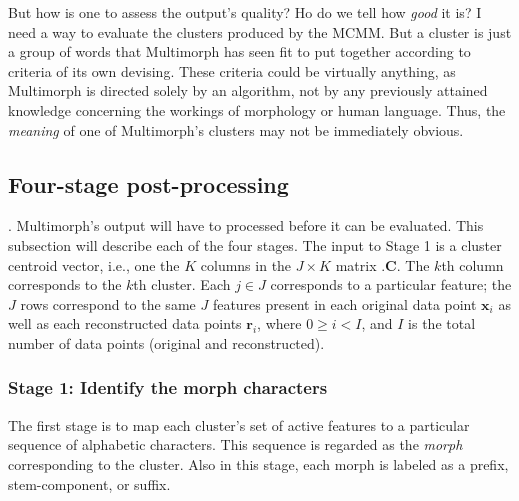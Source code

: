 But how is one to assess the output's quality? Ho do we tell how \emph{good} it is? I need a way to evaluate the clusters produced by the MCMM.
But a cluster is just a group of words that Multimorph has seen fit to put together according to criteria of its own devising.
These criteria could be virtually anything, as Multimorph is directed solely by an algorithm, not by any previously attained knowledge concerning
the workings of morphology or human language. 
Thus, the \emph{meaning} of one of Multimorph's clusters may not be immediately obvious.
 
 
\subsection{Four-stage post-processing} \label{sec:extrinsic}. Multimorph's output 
will have to processed before it can be evaluated. This subsection 
will describe each of the four stages. The input to Stage 1 is a cluster centroid vector, 
i.e., one the $K$ columns in the $J \times K$ matrix $.\mathbf{C}$. The $k$th column 
corresponds to the $k$th cluster. Each $j \in J$ corresponds to a particular feature; the 
$J$ rows correspond to the same $J$ features present in each original data point 
$\mathbf{x}_{i}$ as well as each reconstructed data points $\mathbf{r}_{i}$, where 
$0 \ge i < I$, and $I$ is the total number of data points (original and reconstructed).

\subsubsection{Stage 1: Identify the morph characters} The first stage is to map each cluster's set of active features to a particular sequence of alphabetic characters. This sequence is regarded as the \emph{morph} corresponding to the cluster. Also in this stage, each morph is labeled as a prefix, stem-component, or suffix.

